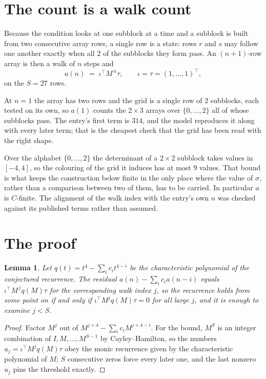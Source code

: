 \documentclass[11pt,a4paper]{article}
\theoremstyle{plain}
\newtheorem{lemma}[theorem]{Lemma}
\theoremstyle{definition}
\begin{document}
\section{The count is a walk count}

Because the condition looks at one subblock at a time and a subblock is
built from two consecutive array rows, a single row is a state: rows $r$ and $s$ may follow one
another exactly when all $2$ of the subblocks they form pass. An $(n+1)$-row array is then a
walk of $n$ steps and
\[
a(n)\;=\;\iota^{\!\top}M^{\,n}\tau,\qquad\iota=\tau=(1,\dots,1)^{\!\top},
\]
on the $S=27$ rows.

At $n=1$ the array has two rows and the grid is a single row of $2$
subblocks, each tested on its own, so $a(1)$ counts the
$2\times3$ arrays over $\{0,\dots,2\}$ all of whose subblocks pass. The entry's
first term is $314$, and the model reproduces it along with every later term; that is the
cheapest check that the grid has been read with the right shape.

Over the alphabet $\{0,\dots,2\}$ the determinant of a $2\times2$ subblock takes values in
$[-4,4]$, so the colouring of the grid it induces has at most $9$ values.
That bound is what keeps the construction below finite in the only place where the value of
$\sigma$, rather than a comparison between two of them, has to be carried.
In particular $a$ is $C$-finite. The alignment of the walk index with the entry's own $n$ was
checked against its published terms rather than assumed.

\section{The proof}

\begin{lemma}\label{lem:crit}
Let $q(t)=t^{4}-\sum_i c_it^{4-i}$ be the characteristic polynomial of the
conjectured recurrence. The residual $a(n)-\sum_ic_ia(n-i)$ equals
$\iota^{\!\top}M^{\,j}q(M)\tau$ for the corresponding walk index $j$, so the recurrence
holds from some point on if and only if $\iota^{\!\top}M^{j}q(M)\tau=0$ for all large $j$,
and it is enough to examine $j<S$.
\end{lemma}

\begin{proof}
Factor $M^{j}$ out of $M^{j+4}-\sum_ic_iM^{j+4-i}$. For the bound, $M^{S}$
is an integer combination of $I,M,\dots,M^{S-1}$ by Cayley--Hamilton, so the numbers
$u_j=\iota^{\!\top}M^{j}q(M)\tau$ obey the monic recurrence given by the characteristic
polynomial of $M$; $S$ consecutive zeros force every later one, and the last nonzero $u_j$
pins the threshold exactly.
\end{proof}
\end{document}
